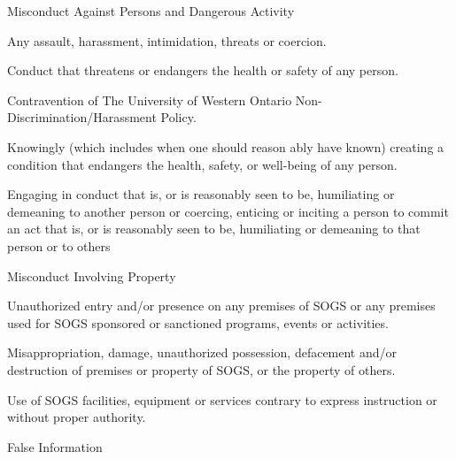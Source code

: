 \begin{longenum}[ label*=\arabic*., align=left]
\begin{longenum}[ label*=\arabic*., align=left]
                  
                  \item Misconduct Against Persons and Dangerous Activity
                 \begin{longenum}[ label*=\arabic*., align=left]
                       \item Any assault, harassment, intimidation, threats or coercion.
                       \item Conduct that threatens or endangers the health or safety of any person.
                       \item Contravention  of  The  University  of  Western  Ontario  Non-Discrimination/Harassment Policy.
                       \item Knowingly  (which  includes  when  one  should  reason ably  have  known)  creating  a condition that endangers the health, safety, or well-being of any person.
                       \item Engaging in conduct that is, or is reasonably seen to be, humiliating or demeaning to another  person  or  coercing,  enticing  or  inciting  a  person  to commit  an  act  that  is,  or  is reasonably seen to be, humiliating or demeaning to that person or to others
\end{longenum}
             \item Misconduct Involving Property
                 \begin{longenum}[ label*=\arabic*., align=left]

                        \item Unauthorized entry and/or presence on any premises of SOGS or any premises used for SOGS sponsored or sanctioned programs, events or activities.
                        \item Misappropriation,  damage,  unauthorized  possession,  defacement  and/or  destruction of premises or property of SOGS, or the property of others.
                        \item Use  of  SOGS  facilities,  equipment  or  services  contrary  to  express  instruction  or without proper authority.
                  \end{longenum}
             
               \item False Information
                  \begin{longenum}[ label*=\arabic*., align=left]


\end{longenum}
\end{longenum}
\end{longenum}
